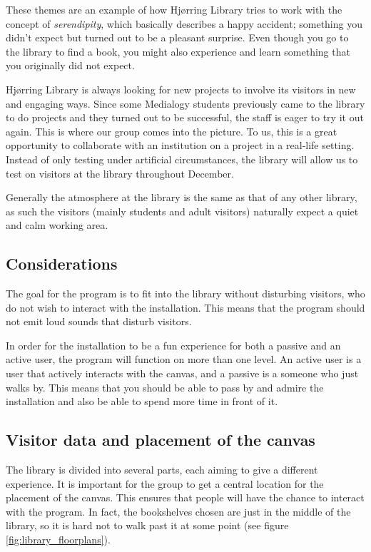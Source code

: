 These themes are an example of how Hj{\o}rring Library tries to work with the concept of \textit{serendipity}, which basically describes a happy accident; something you didn't expect but turned out to be a pleasant surprise. Even though you go to the library to find a book, you might also experience and learn something that you originally did not expect.

Hj{\o}rring Library is always looking for new projects to involve its visitors in new and engaging ways. Since some Medialogy students previously came to the library to do projects and they turned out to be successful, the staff is eager to try it out again. This is where our group comes into the picture. To us, this is a great opportunity to collaborate with an institution on a project in a real-life setting. Instead of only testing under artificial circumstances, the library will allow us to test on visitors at the library throughout December.

Generally the atmosphere at the library is the same as that of any other library, as such the visitors (mainly students and adult visitors) naturally expect a quiet and calm working area.

\subsection{Considerations}
The goal for the program is to fit into the library without disturbing visitors, who do not wish to interact with the installation. This means that the program should not emit loud sounds that disturb visitors.

In order for the installation to be a fun experience for both a passive and an active user, the program will function on more than one level. An active user is a user that actively interacts with the canvas, and a passive is a someone who just walks by. This means that you should be able to pass by and admire the installation and also be able to spend more time in front of it.

\subsection{Visitor data and placement of the canvas}
The library is divided into several parts, each aiming to give a different experience. It is important for the group to get a central location for the placement of the canvas. This ensures that people will have the chance to interact with the program. In fact, the bookshelves chosen are just in the middle of the library, so it is hard not to walk past it at some point (see figure \ref{fig:library_floorplans}).


